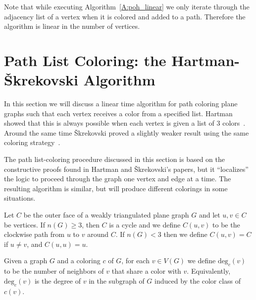 \documentclass[12pt,letterpaper]{article}
\theoremstyle{plain}
\theoremstyle{definition}
\theoremstyle{break}
\begin{document}
Note that while executing Algorithm~\ref{A:poh_linear} we only iterate through
the adjacency list of a vertex when it is colored and added
to a path. Therefore the algorithm is linear in the number of vertices.

\section{Path List Coloring: the Hartman-\v{S}krekovski Algorithm}

In this section we will discuss a linear time algorithm for path coloring
plane graphs such that each vertex receives a color from a specified list.
Hartman showed that this is always possible when each vertex is given a
list of $3$ colors~\cite[Thm.~4.1]{Har1997}. Around the same
time \v{S}krekovski proved a
slightly weaker result using the same coloring
strategy~\cite[Thm.~2.2b]{Skr1999}.

The path list-coloring procedure discussed in this section is
based on the constructive proofs found in Hartman and
\v{S}krekovski's papers, but it ``localizes'' the logic to proceed through the
graph one vertex and edge at a time. The resulting algorithm is
similar, but will produce different colorings in some situations.

Let $C$ be the outer face of a weakly triangulated plane graph $G$ and let
$u,v\in C$ be vertices.
If $n(G)\ge3$, then $C$ is a cycle and we
define $C(u,v)$ to be the clockwise path
from $u$ to $v$ around $C$. If $n(G)<3$ then we define $C(u,v)=C$ if
$u\ne v$, and $C(u,u)=u$.

Given a graph $G$ and a coloring $c$ of $G$, for each $v\in V(G)$ we
define $\text{deg}_c(v)$ to be the number of neighbors of $v$ that share a color
with $v$. Equivalently, $\text{deg}_c(v)$ is the degree of $v$ in the subgraph
of $G$ induced by the color class of $c(v)$.
\end{document}

